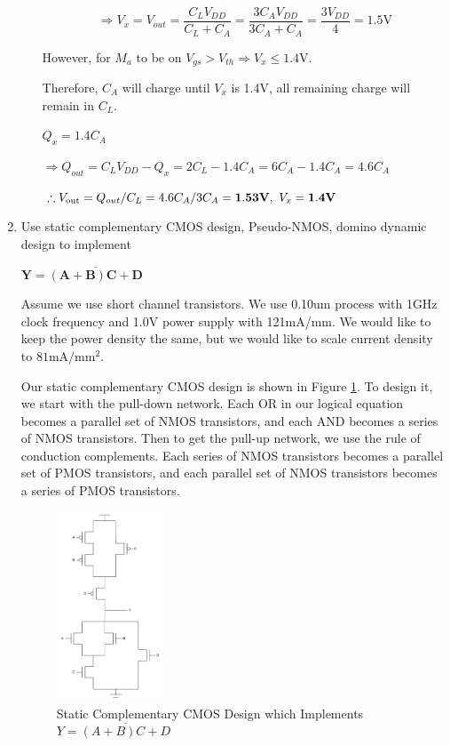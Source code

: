 \documentclass[fleqn]{article}
\begin{document}
\begin{enumerate}
\begin{enumerate}
			\begin{equation*}
				\Rightarrow V_x = V_{out} = \frac{C_LV_{DD}}{C_L + C_A} = \frac{3C_AV_{DD}}{3C_A + C_A} = \frac{3V_{DD}}{4} = 1.5\text{V}
			\end{equation*}
			
			 However, for $M_a$ to be on $V_{gs} > V_{th} \Rightarrow V_x \leq 1.4\text{V}$.
			
			Therefore, $C_A$ will charge until $V_x$ is 1.4V, all remaining charge will remain in $C_L$.
			
			$Q_x = 1.4C_A$
			
			$\Rightarrow Q_{out} = C_LV_{DD} - Q_x = 2C_L - 1.4C_A = 6C_A - 1.4C_A = 4.6C_A$
			
			$\therefore V_\text{out} = Q_{out}/C_L = 4.6C_A/3C_A = \mathbf{1.53\text{\textbf{V}}},\ V_x = \mathbf{1.4\text{\textbf{V}}}$
			
			\end{enumerate}
		
		\item Use static complementary CMOS design, Pseudo-NMOS, domino dynamic design to implement
		
		$\mathbf{Y = \overline{(A + B)C + D}}$
		
		Assume we use short channel transistors. We use 0.10um process with 1GHz clock frequency and 1.0V power supply with 121mA/mm. We would like to keep the power density the same, but we would like to scale current density to $81\text{mA}/\text{mm}^2$.
		
		Our static complementary CMOS design is shown in Figure \ref{fig::problem2_static_cmos}. To design it, we start with the pull-down network. Each OR in our logical equation becomes a parallel set of NMOS transistors, and each AND becomes a series of NMOS transistors. Then to get the pull-up network, we use the rule of conduction complements. Each series of NMOS transistors becomes a parallel set of PMOS transistors, and each parallel set of NMOS transistors becomes a series of PMOS transistors.
		 
		\begin{figure}[H]
			\centerline{\includegraphics[width=0.3\textwidth]{problem2_static_cmos.png}}
			\caption{Static Complementary CMOS Design which Implements $Y = \overline{(A + B)C + D}$}
			\label{fig::problem2_static_cmos}
		\end{figure}


\end{enumerate}
\end{document}
